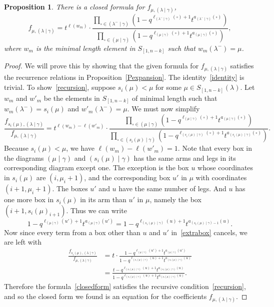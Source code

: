 \documentclass[11pt]{article}
\newtheorem{prop}[theo]{Proposition}
\theoremstyle{definition}
\numberwithin{equation}{section}
\newcommand{\nudom}{{( \lambda \mid \gamma )}}
\newcommand{\lambdagamma}{{\nudom}}
\newcommand{\mugamma}{{(\mu \mid \gamma)}}
\newcommand{\fmuu}{f_{\mu, \lambdagamma}}
\begin{document}
\begin{prop}
There is a closed formula for $\fmuu$,
\begin{equation}\label{closedform} \fmuu = t^{\ell(w_m)} \cdot \frac{\prod\limits_{\square \in (\lambda^- \mid \gamma)} \left( 1-q^{\ell_{(\lambda^- \mid \gamma)} (\square)+1} t^{a_{(\lambda^- \mid \gamma)} (\square)} \right)}{\prod\limits_{\square \in (\mu \mid \gamma)} \left( 1-q^{\ell_{(\mu \mid \gamma)} (\square)+1} t^{a_{(\mu \mid \gamma)} (\square)} \right) }, \end{equation}
where $w_m$ is the minimal length element in $S_{[1,n-k]}$ such that $w_m(\lambda^-)=\mu$.
\end{prop}
\begin{proof}
We will prove this by showing that the given formula for $\fmuu$ satisfies the recurrence relations in Proposition~\ref{Pexpansion}. The identity~\eqref{identity} is trivial. To show~\eqref{recursion}, suppose $s_i(\mu)<\mu$ for some $\mu \in S_{[1,n-k]}(\lambda)$. Let $w_m$ and $w'_m$ be the elements in $S_{[1,n-k]}$ of minimal length such that $w_m(\lambda^-)=s_i(\mu)$ and $w'_m(\lambda^-)=\mu$. We must now simplify
\begin{equation}\label{extrabox}\frac{f_{s_i(\mu),\lambdagamma}}{\fmuu} = t^{\ell(w_m)-\ell(w'_m)} \cdot \frac{\prod\limits_{\square \in (\mu \mid \gamma)} \left( 1-q^{\ell_{(\mu\mid \gamma)} (\square)+1} t^{a_{(\mu \mid \gamma)} (\square)} \right)}{\prod\limits_{\square \in (s_i(\mu) \mid \gamma)} \left( 1-q^{\ell_{(s_i(\mu) \mid \gamma)} (\square)+1} t^{a_{(s_i(\mu) \mid \gamma)} (\square)} \right) }. \end{equation}
Because $s_i(\mu)<\mu$, we have $\ell(w_m)-\ell(w'_m)=1$. Note that every box in the diagrams $\mugamma$ and $(s_i(\mu)\mid \gamma)$ has the same arms and legs in its corresponding diagram except one. The exception is the box $u$ whose coordinates in $s_i(\mu)$ are $(i,\mu_i+1)$, and the corresponding box $u'$ in $\mu$ with coordinates $(i+1,\mu_i+1)$. The boxes $u'$ and $u$ have the same number of legs. And $u$ has one more box in $s_i(\mu)$ in its arm than $u'$ in $\mu$, namely the box $(i+1,s_i(\mu)_{i+1})$. Thus we can write
\[ 1-q^{\ell_{(\mu\mid \gamma)} (u')+1} t^{a_{(\mu \mid \gamma)} (u')}=1-q^{\ell_{(s_i(\mu)\mid \gamma)} (u)+1} t^{a_{(s_i(\mu) \mid \gamma)-1} (u)}.\]
Now since every term from a box other than $u$ and $u'$ in~\eqref{extrabox} cancels, we are left with
\begin{align*} \frac{f_{s_i(\mu),\lambdagamma}}{\fmuu} &= t \cdot \frac{ 1-q^{\ell_{(\mu\mid \gamma)} (u')+1} t^{a_{(\mu \mid \gamma)} (u')}}{ 1-q^{\ell_{(s_i(\mu) \mid \gamma)} (u)+1} t^{a_{(s_i(\mu) \mid \gamma)} (u)} }\\
&= \frac{t-q^{\ell_{(s_i(\mu) \mid \gamma)} (u)+1} t^{a_{(s_i(\mu) \mid \gamma)} (u)}}{1-q^{\ell_{(s_i(\mu) \mid \gamma)} (u)+1} t^{a_{(s_i(\mu) \mid \gamma)} (u)}}.\end{align*}
Therefore the formula~\eqref{closedform} satisfies the recursive condition~\eqref{recursion}, and so the closed form we found is an equation for the coefficients $\fmuu$. \end{proof}
\end{document}
